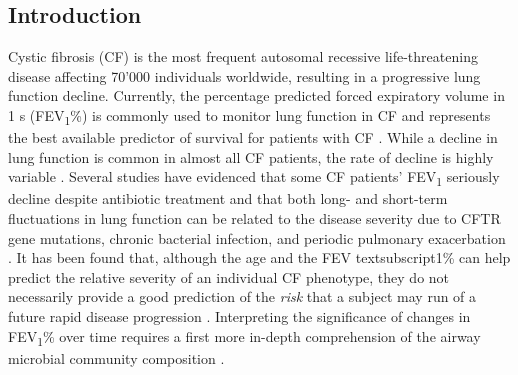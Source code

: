 \subsection{Introduction}
Cystic fibrosis (CF) is the most frequent autosomal recessive life-threatening disease affecting 70'000 individuals worldwide, resulting in a progressive lung function decline. Currently, the percentage predicted forced expiratory volume in 1 s (FEV\textsubscript{1}\%) is commonly used to monitor lung function in CF and represents the best available predictor of survival for patients with CF \cite{taylor2012understanding}. While a decline in lung function is common in almost all CF patients, the rate of decline is highly variable \cite{rosenbluth2004lung}. Several studies have evidenced that some CF patients' FEV\textsubscript{1} seriously decline despite antibiotic treatment \cite{sanders2010failure} and that both long- and short-term fluctuations in lung function can be related to the disease severity due to CFTR gene mutations, chronic bacterial infection, and periodic pulmonary exacerbation \cite{rosenbluth2004lung}. It has been found that, although the age and the FEV textsubscript{1}\% can help predict the relative severity of an individual CF phenotype, they do not necessarily provide a good prediction of the \textit{risk} that a subject may run of a future rapid disease progression \cite{konstan2007risk}. Interpreting the significance of changes in FEV\textsubscript{1}\% over time requires a first more in-depth comprehension of the airway microbial community composition \cite{milla1998risk}.\\
